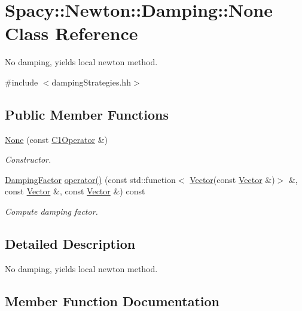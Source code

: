 \hypertarget{classSpacy_1_1Newton_1_1Damping_1_1None}{}\section{Spacy\+:\+:Newton\+:\+:Damping\+:\+:None Class Reference}
\label{classSpacy_1_1Newton_1_1Damping_1_1None}


No damping, yields local newton method.  




{\ttfamily \#include $<$damping\+Strategies.\+hh$>$}

\subsection*{Public Member Functions}
\begin{DoxyCompactItemize}
\item 
\hyperlink{classSpacy_1_1Newton_1_1Damping_1_1None_ac153c7288c074756c6c3eeb8f91eddd4}{None} (const \hyperlink{classSpacy_1_1C1Operator}{C1\+Operator} \&)\hypertarget{classSpacy_1_1Newton_1_1Damping_1_1None_ac153c7288c074756c6c3eeb8f91eddd4}{}\label{classSpacy_1_1Newton_1_1Damping_1_1None_ac153c7288c074756c6c3eeb8f91eddd4}

\begin{DoxyCompactList}\small\item\em Constructor. \end{DoxyCompactList}\item 
\hyperlink{classSpacy_1_1DampingFactor}{Damping\+Factor} \hyperlink{classSpacy_1_1Newton_1_1Damping_1_1None_a79351f9d5d55c598f6723aa0e5ff8ff3}{operator()} (const std\+::function$<$ \hyperlink{classSpacy_1_1Vector}{Vector}(const \hyperlink{classSpacy_1_1Vector}{Vector} \&)$>$ \&, const \hyperlink{classSpacy_1_1Vector}{Vector} \&, const \hyperlink{classSpacy_1_1Vector}{Vector} \&) const 
\begin{DoxyCompactList}\small\item\em Compute damping factor. \end{DoxyCompactList}\end{DoxyCompactItemize}


\subsection{Detailed Description}
No damping, yields local newton method. 

\subsection{Member Function Documentation}
